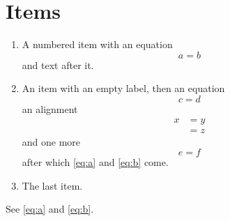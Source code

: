 \documentclass{article}
\begin{document}
\section{Items}
\begin{enumerate}
\item A numbered item with an equation
\begin{equation}\label{eq:a}
a = b
\end{equation}
and text after it.
\item[] An item with an empty label, then an equation
\begin{equation}\label{eq:b}
c = d
\end{equation}
an alignment
\begin{align}
x &= y \\
  &= z
\end{align}
and one more \[ e = f \] after which \ref{eq:a} and \ref{eq:b} come.
\item The last item.
\end{enumerate}
See \eqref{eq:a} and \eqref{eq:b}.
\end{document}
